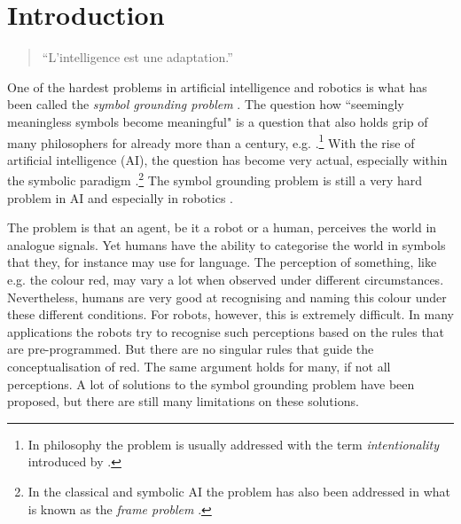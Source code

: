 \chapter{Introduction}\label{ch:intro}


\begin{quote}
{\large ``L'intelligence est une adaptation.''\\
\cite{piaget:1966}}
\end{quote}


\noindent One of the hardest problems in artificial intelligence and robotics is what has been called the {\em symbol grounding problem} \citep{harnad:1990}. The question how ``seemingly meaningless symbols become meaningful" \citep{harnad:1990} is a question that also holds grip of many philosophers for already more than a century, e.g. \citet{bretano:1874,searle:1980,dennett:1991}.\footnote{In philosophy the problem is usually addressed with the term {\em intentionality} introduced by \citet{bretano:1874}.} With the rise of artificial intelligence (AI), the question has become very actual, especially within the symbolic paradigm \citep{newell:1990}.\footnote{In the classical and symbolic AI the problem has also been addressed in what is known as the {\em frame problem} \citep{pylyshyn:1987}.} The symbol grounding problem is still a very hard problem in AI and especially in robotics \citep{pfeiferscheier:1999}.

The problem is that an agent, be it a robot or a human, perceives the world in analogue signals. Yet humans have the ability to categorise the world in symbols that they, for instance may use for language. The perception of something, like e.g. the colour red, may vary a lot when observed under different circumstances. Nevertheless, humans are very good at recognising and naming this colour under these different conditions. For robots, however, this is extremely difficult. In many applications the robots try to recognise such perceptions based on the rules that are pre-programmed. But there are no singular rules that guide the conceptualisation of red. The same argument holds for many, if not all perceptions. A lot of solutions to the symbol grounding problem have been proposed, but there are still many limitations on these solutions. 

